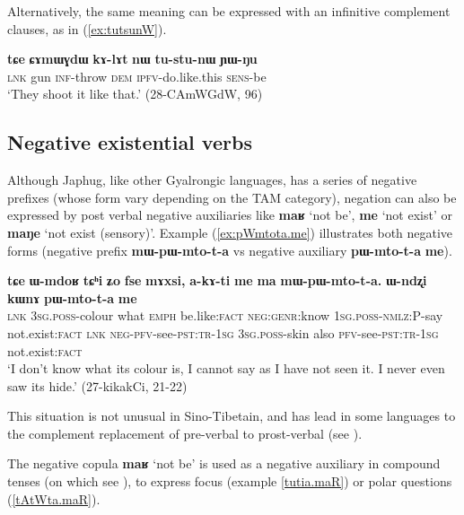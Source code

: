 \documentclass[oneside,a4paper,11pt]{article}
\newcommand{\ipa}[1]{\textbf{\phon#1}} %
\newcommand{\jpg}[2]{\ipa{#1} `#2'} %
\newcommand{\refb}[1]{(\ref{#1})}
\begin{document}
 Alternatively, the same meaning can be expressed with an infinitive complement clauses, as in \refb{ex:tutsunW}.
 
 \begin{exe}
\ex \label{ex:tutsunW}
\gll \ipa{tɕe} 	\ipa{ɕɤmɯɣdɯ} 	\ipa{kɤ-lɤt} 	\ipa{nɯ} 	\ipa{tu-stu-nɯ} 	\ipa{ɲɯ-ŋu}  \\
\textsc{lnk} gun \textsc{inf}-throw \textsc{dem} \textsc{ipfv}-do.like.this \textsc{sens}-be \\
\glt `They shoot it like that.' (28-CAmWGdW, 96)
\end{exe}

\subsection{Negative existential verbs} \label{sec:neg}
Although Japhug, like other Gyalrongic languages, has a series of negative prefixes (whose form vary depending on the TAM category), negation can also be expressed by post verbal negative auxiliaries like \jpg{maʁ}{not be}, \jpg{me}{not exist} or \jpg{maŋe}{not exist (sensory)}. Example \refb{ex:pWmtota.me} illustrates both negative forms (negative prefix \ipa{mɯ-pɯ-mto-t-a} vs negative auxiliary \ipa{pɯ-mto-t-a}  \ipa{me}).

\begin{exe}
\ex \label{ex:pWmtota.me}
\gll  
\ipa{tɕe} 	\ipa{ɯ-mdoʁ} 	\ipa{tɕʰi} 	\ipa{ʑo} 	\ipa{fse} 	\ipa{mɤxsi,} 	\ipa{a-kɤ-ti} 	\ipa{me} 	\ipa{ma} 	\ipa{mɯ-pɯ-mto-t-a.} \ipa{ɯ-ndʐi} 	\ipa{kɯnɤ} 	\ipa{pɯ-mto-t-a} 	\ipa{me}  \\
\textsc{lnk} \textsc{3sg.poss}-colour what \textsc{emph} be.like:\textsc{fact} \textsc{neg:genr}:know \textsc{1sg.poss-nmlz:P}-say not.exist:\textsc{fact} \textsc{lnk} \textsc{neg-pfv}-see-\textsc{pst:tr-1sg}  \textsc{3sg.poss}-skin also  \textsc{pfv}-see-\textsc{pst:tr-1sg} not.exist:\textsc{fact} \\
\glt  `I don't know what its colour is, I cannot say as I have not seen it. I never even saw its hide.'  (27-kikakCi, 21-22)
\end{exe}

This situation is not unusual in Sino-Tibetain, and has lead in some languages to the complement replacement of pre-verbal  to prost-verbal (see \citealt{post15neg}).

The negative copula \jpg{maʁ}{not be} is used as a negative auxiliary in compound tenses (on which see \citealt[268-9]{jacques14linking}), to express focus (example \ref{tutia.maR}) or polar questions (\ref{tAtWta.maR}).
 
\end{document}

